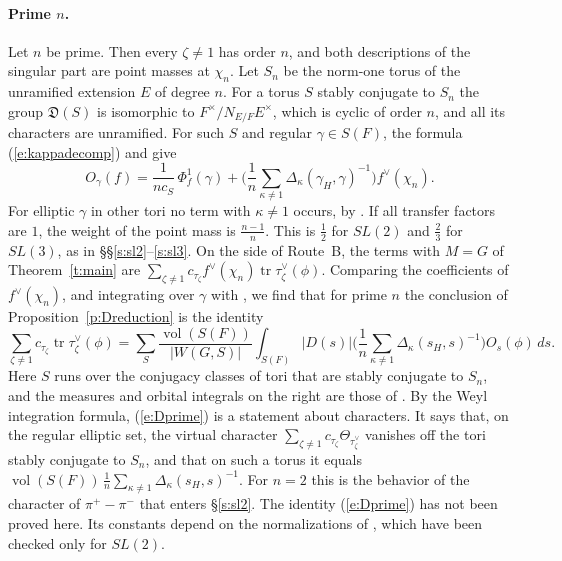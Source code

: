 \documentclass[12pt,letterpaper]{article}
\numberwithin{equation}{section}
\theoremstyle{plain}
\theoremstyle{definition}
\theoremstyle{remark}
\DeclareMathOperator{\vol}{vol}
\DeclareMathOperator{\tr}{tr}
\begin{document}
\paragraph{Prime $n$.} Let $n$ be prime. Then every $\zeta\ne1$ has order $n$, and both descriptions of the singular part are point masses at $\chi_n$. Let $S_n$ be the norm-one torus of the unramified extension $E$ of degree $n$. For a torus $S$ stably conjugate to $S_n$ the group $\mathfrak D(S)$ is isomorphic to $F^\times/N_{E/F}E^\times$, which is cyclic of order $n$, and all its characters are unramified. For such $S$ and regular $\gamma\in S(F)$, the formula (\ref{e:kappadecomp}) and \cite[Prop.~5.1]{JC26} give
\[
O_\gamma(f)=\frac{1}{nc_S}\,\Phi^1_f(\gamma)+\Big(\frac1n\sum_{\kappa\ne1}\Delta_\kappa(\gamma_H,\gamma)^{-1}\Big)f^\vee(\chi_n).
\]
For elliptic $\gamma$ in other tori no term with $\kappa\ne1$ occurs, by \cite[(5.11)]{JC26}. If all transfer factors are $1$, the weight of the point mass is $\frac{n-1}{n}$. This is $\frac12$ for $SL(2)$ and $\frac23$ for $SL(3)$, as in \S\S\ref{s:sl2}--\ref{s:sl3}. On the side of Route~B, the terms with $M=G$ of Theorem~\ref{t:main} are $\sum_{\zeta\ne1}c_{\tau_\zeta}f^\vee(\chi_n)\tr\tau_\zeta^\vee(\phi)$. Comparing the coefficients of $f^\vee(\chi_n)$, and integrating over $\gamma$ with \cite[(4.11)]{JC26}, we find that for prime $n$ the conclusion of Proposition~\ref{p:Dreduction} is the identity
\begin{equation}\label{e:Dprime}
\sum_{\zeta\ne1}c_{\tau_\zeta}\tr\tau_\zeta^\vee(\phi)=\sum_{S}\frac{\vol(S(F))}{|W(G,S)|}\int_{S(F)}|D(s)|\Big(\frac1n\sum_{\kappa\ne1}\Delta_\kappa(s_H,s)^{-1}\Big)O_s(\phi)\,ds .
\end{equation}
Here $S$ runs over the conjugacy classes of tori that are stably conjugate to $S_n$, and the measures and orbital integrals on the right are those of \cite[\S\S4--5]{JC26}. By the Weyl integration formula, (\ref{e:Dprime}) is a statement about characters. It says that, on the regular elliptic set, the virtual character $\sum_{\zeta\ne1}c_{\tau_\zeta}\Theta_{\tau_\zeta^\vee}$ vanishes off the tori stably conjugate to $S_n$, and that on such a torus it equals $\vol(S(F))\,\frac1n\sum_{\kappa\ne1}\Delta_\kappa(s_H,s)^{-1}$. For $n=2$ this is the behavior of the character of $\pi^+-\pi^-$ that enters \S\ref{s:sl2}. The identity (\ref{e:Dprime}) has not been proved here. Its constants depend on the normalizations of \cite[\S5]{JC26}, which have been checked only for $SL(2)$.
\end{document}
